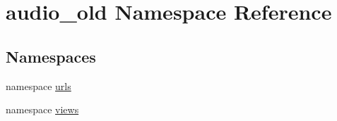 \hypertarget{namespaceaudio__old}{
\section{audio\_\-old Namespace Reference}
\label{namespaceaudio__old}
}
\subsection*{Namespaces}
\begin{DoxyCompactItemize}
\item 
namespace \hyperlink{namespaceaudio__old_1_1urls}{urls}
\item 
namespace \hyperlink{namespaceaudio__old_1_1views}{views}
\end{DoxyCompactItemize}
